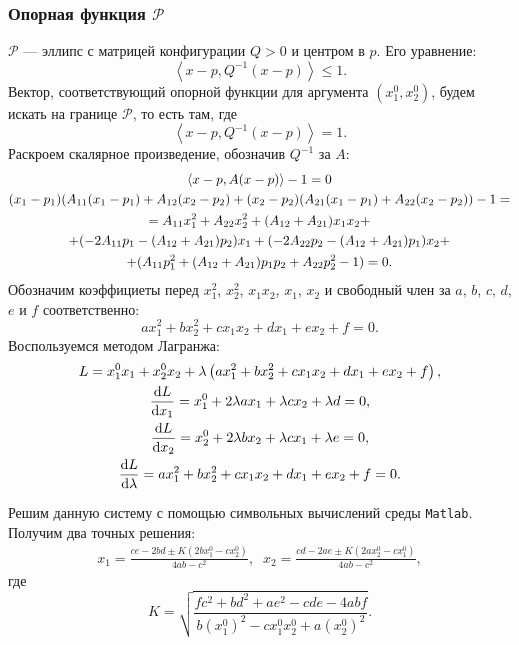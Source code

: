 \documentclass[11pt]{article}
\newcommand{\scalar}[2]{\left<#1,#2\right>}
\renewcommand{\d}[1]{\ensuremath{\operatorname{d}\!{#1}}}
\begin{document}
\subsubsection{Опорная функция $\mathcal{P}$}
$\mathcal{P}$ --- эллипс с матрицей конфигурации $Q > 0$ и центром в $p$. Его уравнение:
$$
\scalar{x - p}{Q^{-1}(x - p)} \leqslant 1.
$$
Вектор, соответствующий опорной функции для аргумента $\left( x_1^0, x_2^0\right)$, будем искать на границе $\mathcal{P}$, то есть там, где
$$
\scalar{x - p}{Q^{-1}(x - p)} = 1.
$$
Раскроем скалярное произведение, обозначив $Q^{-1}$ за $A$:
\begin{gather}
\scalar{x - p}{A(x - p)} - 1 = 0 \notag \\
(x_1 - p_1) (A_{11}(x_1 - p_1) + A_{12}(x_2 - p_2) + (x_2 - p_2) (A_{21}(x_1 - p_1) + A_{22}(x_2 - p_2)) - 1 = \notag \\
= A_{11} x_1^2 + A_{22} x_2^2 + (A_{12} + A_{21}) x_1 x_2 + \notag \\
+ (-2 A_{11} p_1 - (A_{12} + A_{21}) p_2) x_1 + (-2 A_{22} p_2 - (A_{12} + A_{21}) p_1) x_2 + \notag \\
+ (A_{11} p_1^2 + (A_{12} + A_{21}) p_1 p_2 + A_{22} p_2^2 - 1) = 0. \notag
\end{gather}
Обозначим коэффициеты перед $x_1^2$, $x_2^2$, $x_1 x_2$, $x_1$, $x_2$ и свободный член за $a$, $b$, $c$, $d$, $e$ и $f$ соответственно:
$$
a x_1^2 + b x_2^2 + c x_1 x_2 + d x_1 + e x_2 + f = 0.
$$
Воспользуемся методом Лагранжа:
\begin{gather}
L = x_1^0 x_1 + x_2^0 x_2 + \lambda \left( a x_1^2 + b x_2^2 + c x_1 x_2 + d x_1 + e x_2 + f \right), \notag \\
\frac{\d{L}}{\d{x_1}} = x_1^0 + 2\lambda a x_1 + \lambda c x_2 + \lambda d = 0, \notag \\
\frac{\d{L}}{\d{x_2}} = x_2^0 + 2\lambda b x_2 + \lambda c x_1 + \lambda e = 0, \notag \\
\frac{\d{L}}{\d{\lambda}} = a x_1^2 + b x_2^2 + c x_1 x_2 + d x_1 + e x_2 + f = 0. \notag
\end{gather}

Решим данную систему с помощью символьных вычислений среды \texttt{Matlab}. Получим два точных решения:
\begin{gather}
x_1 =
\frac{
	ce - 2bd \pm
	K\left(
		2bx_1^0 - cx_2^0
	\right)
}
{
    4ab - c^2
}
, \; \;
x_2 =
\frac{
	cd - 2ae \pm
	K\left(
		2ax_2^0 - cx_1^0
	\right)
}
{
    4ab - c^2
}
, \label{SF_P}
\end{gather}
где
$$
K =	\sqrt{\frac{fc^2 + bd^2 + ae^2 - cde - 4abf}
		{
			b
			\left(
				x_1^0
			\right)
			^2 - cx_1^0x_2^0 + a
			\left(
				x_2^0
			\right)
			^2
		}}.
$$
\end{document}
